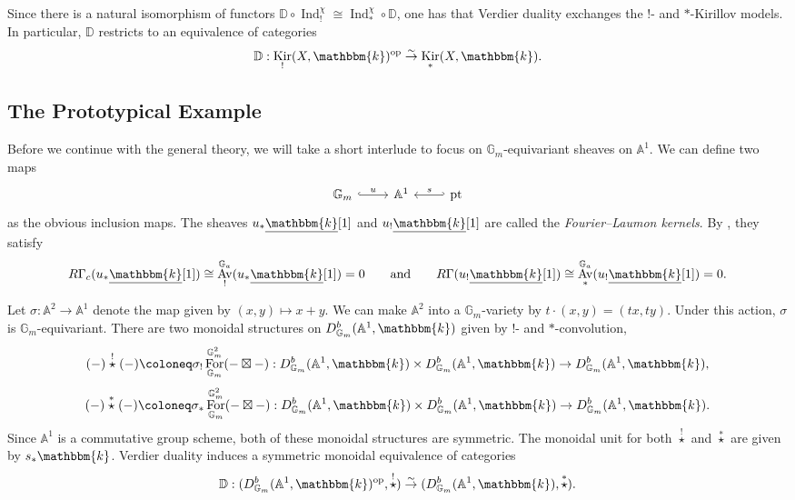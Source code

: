 \documentclass{amsart}
\newcommand{\A}{\mathbb{A}}
\newcommand{\G}{\mathbb{G}}
\renewcommand{\k}{\mathbbm{k}}
\DeclareMathOperator{\Ind}{Ind}
\newcommand{\DD}{\mathbb{D}}
\DeclareMathOperator{\Av}{Av}
\newcommand{\uk}{\underline{\k}}
\DeclareMathOperator{\For}{For}
\DeclareMathOperator{\pt}{pt}
\DeclareMathOperator{\op}{op}
\DeclareMathOperator{\Kir}{Kir}
\newcommand{\sstar}{\stackrel{*}{\star}}
\newcommand{\cstar}{\stackrel{!}{\star}}
\theoremstyle{definition}
\begin{document}
    Since there is a natural isomorphism of functors $\DD \circ \Ind_!^{\chi} \cong \Ind_*^{\chi} \circ \DD$, one has that Verdier duality exchanges the $!$- and $*$-Kirillov models. 
    In particular, $\DD$ restricts to an equivalence of categories
    \[\DD : \Kir_! (X, \k)^{\op} \stackrel{\sim}{\to} \Kir_* (X, \k).\]

    \subsection{The Prototypical Example}

    Before we continue with the general theory, we will take a short interlude to focus on $\G_m$-equivariant sheaves on $\A^1$.
    We can define two maps
    \[\begin{tikzcd}
    \G_m \arrow[r, "u", hook] & \A^1 & \pt \arrow[l, "s"', hook']
    \end{tikzcd}\]
    as the obvious inclusion maps.
    The sheaves $u_* \uk [1]$ and $u_! \uk [1]$ are called the \emph{Fourier--Laumon kernels}. By \cite[Lemme 1.4]{Lau}, they satisfy
    \begin{equation}\label{eq:properties_of_FL_kernels}
        R\Gamma_c (u_* \uk [1]) \cong \Av^{\G_a}_! (u_* \uk [1]) = 0 \qquad\text{and}\qquad  R\Gamma (u_! \uk [1]) \cong \Av^{\G_a}_* (u_! \uk [1]) = 0. 
    \end{equation}

    Let $\sigma : \A^2 \to \A^1$ denote the map given by $(x,y) \mapsto x+y$. 
    We can make $\A^2$ into a $\G_m$-variety by $t \cdot (x,y) = (tx,ty)$. Under this action, $\sigma$ is $\G_m$-equivariant.
    There are two monoidal structures on $D_{\G_m}^b (\A^1, \k)$ given by $!$- and $*$-convolution,
    \[(-) \cstar (-) \coloneq \sigma_! \For^{\G_m^2}_{\G_m} (- \boxtimes -) : D_{\G_m}^b (\A^1, \k) \times D_{\G_m}^b (\A^1, \k) \to D_{\G_m}^b (\A^1, \k),\]
    \[(-) \sstar (-) \coloneq \sigma_* \For^{\G_m^2}_{\G_m} (- \boxtimes -) : D_{\G_m}^b (\A^1, \k) \times D_{\G_m}^b (\A^1, \k) \to D_{\G_m}^b (\A^1, \k).\]
    Since $\A^1$ is a commutative group scheme, both of these monoidal structures are symmetric.
    The monoidal unit for both $\cstar$ and $\sstar$ are given by $s_* \k$. 
    Verdier duality induces a symmetric monoidal equivalence of categories
    \[\DD : (D_{\G_m}^b (\A^1, \k)^{\op}, \cstar) \stackrel{\sim}{\to}  (D_{\G_m}^b (\A^1, \k), \sstar).\]
\end{document}
